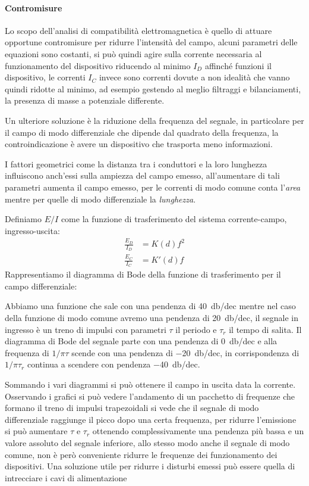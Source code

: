\newpage

\paragraph{Contromisure}
Lo scopo dell'analisi di compatibilità elettromagnetica è quello di attuare opportune
contromisure per ridurre l'intensità del campo, alcuni parametri delle equazioni sono costanti,
si può quindi agire sulla corrente necessaria al funzionamento del dispositivo
riducendo al minimo $I_D$ affinché funzioni il dispositivo, le correnti $I_C$ invece sono correnti 
dovute a non idealità che vanno quindi ridotte al minimo, ad esempio gestendo al meglio
filtraggi e bilanciamenti, la presenza di masse a potenziale differente.

Un ulteriore soluzione è la riduzione della frequenza del segnale, in particolare
per il campo di modo differenziale che dipende dal quadrato della frequenza,
la controindicazione è avere un dispositivo che trasporta meno informazioni.

I fattori geometrici come la distanza tra i conduttori e la loro lunghezza influiscono
anch'essi sulla ampiezza del campo emesso, all'aumentare di tali parametri aumenta il campo emesso,
per le correnti di modo comune conta l'\textit{area} mentre per quelle di modo differenziale la \textit{lunghezza}.

Definiamo $E/I$ come la funzione di trasferimento del sistema corrente-campo, ingresso-uscita:
\begin{equation*}
\begin{split}
\frac{E_D}{I_D} & = K(d)f^2 \\
\frac{E_C}{I_C} & = K'(d)f
\end{split}
\end{equation*}
Rappresentiamo il diagramma di Bode della funzione di trasferimento per il campo differenziale:


Abbiamo una funzione che sale con una pendenza di \SI{+40}{\decibel/dec} mentre nel caso della funzione
di modo comune avremo una pendenza di \SI{+20}{\decibel/dec}, il segnale in ingresso
è un treno di impulsi con parametri $\tau$ il periodo e $\tau_r$ il tempo di salita.
Il diagramma di Bode del segnale parte con una pendenza di \SI{0}{\decibel/dec} e alla frequenza di $1/\pi\tau$
scende con una pendenza di \SI{-20}{\decibel/dec}, in corrispondenza di $1/\pi\tau_r$ continua
a scendere con pendenza \SI{-40}{\decibel/dec}.

Sommando i vari diagrammi si può ottenere il campo in uscita data la corrente.
Osservando i grafici si può vedere l'andamento di un pacchetto di frequenze che formano il treno %
di impulsi trapezoidali si vede che il segnale di modo
differenziale raggiunge il picco dopo una certa frequenza, per ridurre l'emissione si può aumentare
$\tau$ e $\tau_r$ ottenendo complessivamente una pendenza più bassa e un valore assoluto del segnale
inferiore, allo stesso modo anche il segnale di modo comune, non è però conveniente ridurre le frequenze dei funzionamento dei dispositivi.
Una soluzione utile per ridurre i disturbi emessi può essere quella di intrecciare i cavi di alimentazione

